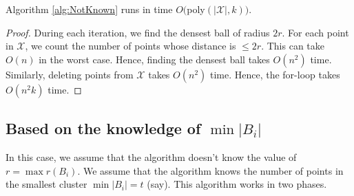 \documentclass[11pt]{article}
\begin{document}
\begin{theorem}
Algorithm \ref{alg:NotKnown} runs in time $O($poly$(|\mathcal{X}|,k))$.
\end{theorem}
\begin{proof}
During each iteration, we find the densest ball of radius $2r$. For each point in $\mathcal{X}$, we count the number of points whose distance is $\le 2r$. This can take $O(n)$ in the worst case. Hence, finding the densest ball takes $O(n^2)$ time. Similarly, deleting points from $\mathcal{X}$ takes $O(n^2)$ time. Hence, the for-loop takes $O(n^2k)$ time.
\end{proof}

\subsection{Based on the knowledge of $\min |B_i|$}
In this case, we assume that the algorithm doesn't know the value of $r = \max r(B_i)$. We assume that the algorithm knows the number of points in the smallest cluster $\min |B_i| = t$ (say). This algorithm works in two phases.
\end{document}
